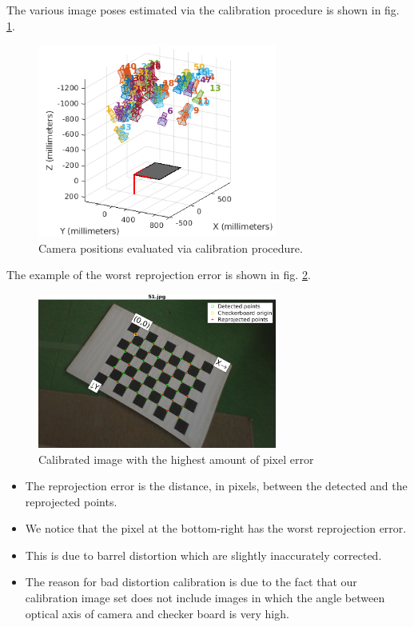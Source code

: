 The various image poses estimated via the calibration procedure is shown in fig. \ref{fig:poses}.
\begin{figure}[H]
\begin{center}
\includegraphics[width=0.7\textwidth]{graphics/camera_positions.png}
\caption{Camera positions evaluated via calibration procedure.}
\label{fig:poses}
\end{center}
\end{figure}

The example of the worst reprojection error is shown in fig. \ref{fig:worst-calibrated-image}.
\begin{figure}[H]
\begin{center}
\includegraphics[width=0.7\textwidth]{graphics/worst.png}
\caption{Calibrated image with the highest amount of pixel error}
\label{fig:worst-calibrated-image}
\end{center}
\end{figure}
\begin{itemize}
\item The reprojection error is the distance, in pixels, between the detected and the reprojected points.
\item We notice that the pixel at the bottom-right has the worst reprojection error.
\item This is due to barrel distortion which are slightly inaccurately corrected.
\item The reason for bad distortion calibration is due to the fact that our calibration image set does not include images in which the angle between optical axis of camera and checker board is very high.
\end{itemize}



